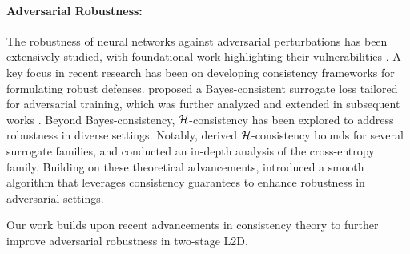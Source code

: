 \paragraph{Adversarial Robustness:}
The robustness of neural networks against adversarial perturbations has been extensively studied, with foundational work highlighting their vulnerabilities \citep{Biggio_2013, szegedy2014intriguingpropertiesneuralnetworks, goodfellow2014explaining, Madry2017TowardsDL}. A key focus in recent research has been on developing consistency frameworks for formulating robust defenses. \citet{bao2021calibratedsurrogatelossesadversarially} proposed a Bayes-consistent surrogate loss tailored for adversarial training, which was further analyzed and extended in subsequent works \citep{meunier2022consistencyadversarialclassification, awasthi2021calibrationconsistencyadversarialsurrogate}. Beyond Bayes-consistency, $\mathcal{H}$-consistency has been explored to address robustness in diverse settings. Notably, \citet{Awasthi_Mao_Mohri_Zhong_2022_multi} derived $\mathcal{H}$-consistency bounds for several surrogate families, and \citet{mao2023crossentropylossfunctionstheoretical} conducted an in-depth analysis of the cross-entropy family. Building on these theoretical advancements, \citet{Grounded} introduced a smooth algorithm that leverages consistency guarantees to enhance robustness in adversarial settings. 

Our work builds upon recent advancements in consistency theory to further improve adversarial robustness in two-stage L2D.
